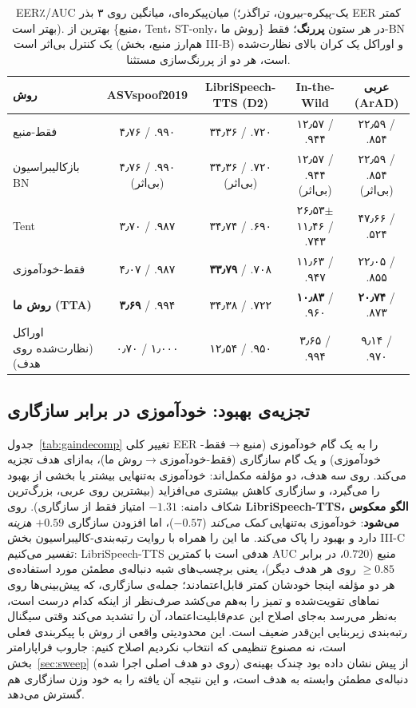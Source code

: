 \documentclass[a4paper,11pt]{article}
\begin{document}
\begin{table}[t]
\centering
\caption{EER٪/AUC میان‌پیکره‌ای، میانگین روی ۳ بذر (یک-پیکره-بیرون،
تراگذر؛ EER کمتر بهتر است). بهترین از \{منبع، Tent، ST-only، روش ما\} در
هر ستون \textbf{پررنگ}؛ فقط-BN یک کنترل بی‌اثر است (هم‌ارز منبع، بخش
III-B) و اوراکل یک کران بالای نظارت‌شده است، هر دو از پررنگ‌سازی مستثنا.}
\label{tab:main}
\begin{tabular}{@{}lcccc@{}}
\toprule
روش & ASVspoof2019 & LibriSpeech-TTS (D2) & In-the-Wild & عربی (ArAD) \\
\midrule
فقط-منبع & ۴٫۷۶ / .۹۹۰ & ۳۴٫۳۶ / .۷۲۰ & ۱۲٫۵۷ / .۹۴۴ & ۲۲٫۵۹ / .۸۵۴ \\
بازکالیبراسیون BN~\cite{adabn} & ۴٫۷۶ / .۹۹۰ (بی‌اثر) & ۳۴٫۳۶ / .۷۲۰ (بی‌اثر) & ۱۲٫۵۷ / .۹۴۴ (بی‌اثر) & ۲۲٫۵۹ / .۸۵۴ (بی‌اثر) \\
Tent~\cite{tent} & ۳٫۷۰ / .۹۸۷ & ۳۴٫۷۴ / .۶۹۰ & ۲۶٫۵۳$\pm$۱۱٫۴۶ / .۷۴۳ & ۴۷٫۶۶ / .۵۲۴ \\
فقط-خودآموزی & ۴٫۰۷ / .۹۸۷ & \textbf{۳۳٫۷۹} / .۷۰۸ & ۱۱٫۶۳ / .۹۴۷ & ۲۲٫۰۵ / .۸۵۵ \\
\rowcolor{green!12}\textbf{روش ما (TTA)} & \textbf{۳٫۶۹} / .۹۹۴ & ۳۴٫۳۸ / .۷۲۲ & \textbf{۱۰٫۸۳} / .۹۶۰ & \textbf{۲۰٫۷۴} / .۸۷۳ \\
\midrule
اوراکل (نظارت‌شده روی هدف) & ۰٫۷۰ / ۱٫۰۰۰ & ۱۲٫۵۴ / .۹۵۰ & ۳٫۶۵ / .۹۹۴ & ۹٫۱۴ / .۹۷۰ \\
\bottomrule
\end{tabular}
\end{table}

\subsection{تجزیه‌ی بهبود: خودآموزی در برابر سازگاری}
\label{sec:gaindecomp}
جدول~\ref{tab:gaindecomp} تغییر کلی EER را به یک گام خودآموزی
(منبع$\to$فقط-خودآموزی) و یک گام سازگاری (فقط-خودآموزی$\to$روش ما)، به‌ازای
هدف تجزیه می‌کند. روی سه هدف، دو مؤلفه مکمل‌اند: خودآموزی به‌تنهایی بیشتر یا
بخشی از بهبود را می‌گیرد، و سازگاری کاهش بیشتری می‌افزاید (بیشترین روی
عربی، بزرگ‌ترین شکاف دامنه: $-1.31$ امتیاز فقط از سازگاری). روی
\textbf{LibriSpeech-TTS، الگو معکوس می‌شود}: خودآموزی به‌تنهایی \emph{کمک
می‌کند} ($-0.57$)، اما افزودن سازگاری $+0.59$ \emph{هزینه} دارد و بهبود را
پاک می‌کند. ما این را همراه با روایت رتبه‌بندی-کالیبراسیون بخش III-C تفسیر
می‌کنیم: LibriSpeech-TTS هدفی است با کمترین AUC منبع ($0.720$، در برابر
$\geq\!0.85$ روی هر هدف دیگر)، یعنی برچسب‌های شبه دنباله‌ی مطمئن مورد
استفاده‌ی هر دو مؤلفه اینجا خودشان کمتر قابل‌اعتمادند؛ جمله‌ی سازگاری، که
پیش‌بینی‌ها روی نماهای تقویت‌شده و تمیز را به‌هم می‌کشد صرف‌نظر از اینکه
کدام درست است، به‌نظر می‌رسد به‌جای اصلاح این عدم‌قابلیت‌اعتماد، آن را
تشدید می‌کند وقتی سیگنال رتبه‌بندی زیربنایی این‌قدر ضعیف است. این محدودیتی
واقعی از روش با پیکربندی فعلی است، نه مصنوع تنظیمی که انتخاب نکردیم اصلاح
کنیم: جاروب فراپارامتر بخش~\ref{sec:sweep} (روی دو هدف اصلی اجرا شده) از
پیش نشان داده بود چندک بهینه‌ی دنباله‌ی مطمئن وابسته به هدف است، و این
نتیجه آن یافته را به خود وزن سازگاری هم گسترش می‌دهد.
\end{document}
